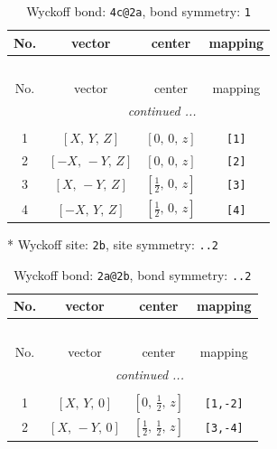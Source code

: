 \documentclass[fleqn,8pt]{jsarticle}
\begin{document}
\renewcommand{\arraystretch}{1.2}
\begin{longtable}{cccc}
\caption{Wyckoff bond: {\tt 4c@2a}, bond symmetry: {\tt 1}}
 \\
 \hline \hline
No. & vector & center & mapping \\ \hline \endfirsthead

\multicolumn{3}{l}{\tablename\ \thetable{}} \\
 \hline \hline
No. & vector & center & mapping \\ \hline \endhead

 \hline \hline
\multicolumn{3}{r}{\footnotesize\it continued ...} \\ \endfoot

 \hline \hline
\multicolumn{3}{r}{} \\ \endlastfoot

1 & $\left[ X,\, Y,\, Z \right]$ & $\left[ 0,\, 0,\, z \right]$ & {\tt [1]} \\ \hline
2 & $\left[ - X,\, - Y,\, Z \right]$ & $\left[ 0,\, 0,\, z \right]$ & {\tt [2]} \\ \hline
3 & $\left[ X,\, - Y,\, Z \right]$ & $\left[ \frac{1}{2},\, 0,\, z \right]$ & {\tt [3]} \\ \hline
4 & $\left[ - X,\, Y,\, Z \right]$ & $\left[ \frac{1}{2},\, 0,\, z \right]$ & {\tt [4]} \\
\end{longtable}
* Wyckoff site: {\tt 2b}, site symmetry: {\tt ..2}
\renewcommand{\arraystretch}{1.2}
\begin{longtable}{cccc}
\caption{Wyckoff bond: {\tt 2a@2b}, bond symmetry: {\tt ..2}}
 \\
 \hline \hline
No. & vector & center & mapping \\ \hline \endfirsthead

\multicolumn{3}{l}{\tablename\ \thetable{}} \\
 \hline \hline
No. & vector & center & mapping \\ \hline \endhead

 \hline \hline
\multicolumn{3}{r}{\footnotesize\it continued ...} \\ \endfoot

 \hline \hline
\multicolumn{3}{r}{} \\ \endlastfoot

1 & $\left[ X,\, Y,\, 0 \right]$ & $\left[ 0,\, \frac{1}{2},\, z \right]$ & {\tt [1,-2]} \\ \hline
2 & $\left[ X,\, - Y,\, 0 \right]$ & $\left[ \frac{1}{2},\, \frac{1}{2},\, z \right]$ & {\tt [3,-4]} \\
\end{longtable}
\end{document}
